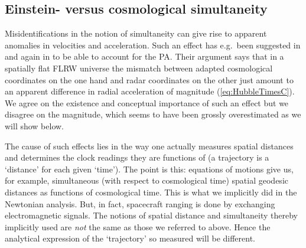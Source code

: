 \documentclass
[rmp,aps,twocolumn,showpacs,preprintnumbers,amsmath,amssymb]{revtex4}
\theoremstyle{plain}
\theoremstyle{definition}
\theoremstyle{remark}
\begin{document}
\subsection{Einstein- versus cosmological simultaneity}
\label{sec:SimultaneityComparison}
%
Misidentifications in the notion of simultaneity can give rise to 
apparent anomalies in velocities and acceleration. Such an effect 
has e.g.~been suggested in \cite{Rosales.Sanchez-Gomez:1998} and 
again in \cite{Rosales:2002} to be able to account for the PA.
Their argument says that in a spatially flat FLRW universe the 
mismatch between adapted cosmological coordinates on the one hand
and radar coordinates on the other just amount to an apparent 
difference in radial acceleration of magnitude (\ref{eq:HubbleTimesC}). 
We agree on the existence and conceptual importance of such an effect 
but we disagree on the magnitude, which seems to have been grossly 
overestimated as we will show below.  

The cause of such effects lies in the way one actually measures 
spatial distances and determines the clock readings they are 
functions of (a trajectory is a `distance' for each given `time'). 
The point is this: equations of motions give us, for example, 
simultaneous (with respect to cosmological time) spatial geodesic 
distances as functions of cosmological time. This is what we implicitly 
did in the Newtonian analysis. But, in fact, spacecraft ranging is done 
by exchanging electromagnetic signals. The notions of spatial distance 
and simultaneity thereby implicitly used are \emph{not} the same as 
those we referred to above. Hence the analytical expression of the 
`trajectory' so measured will be different. 
\end{document}
